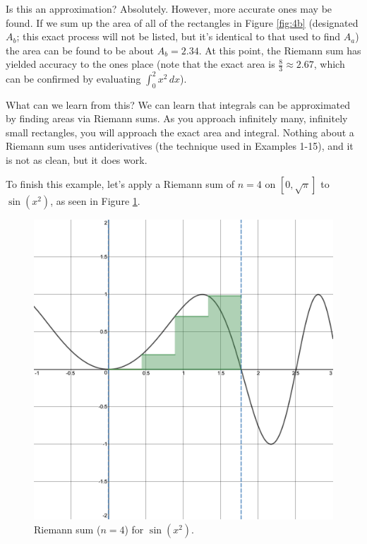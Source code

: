 \documentclass{article}
\newcounter{example}%
\begin{document}
Is this an approximation? Absolutely. However, more accurate ones may be found. If we sum up the area of all of the rectangles in Figure \ref{fig:4b} (designated $A_b$; this exact process will not be listed, but it's identical to that used to find $A_a$) the area can be found to be about $A_b=2.34$. At this point, the Riemann sum has yielded accuracy to the ones place (note that the exact area is $\frac{8}{3}\approx 2.67$, which can be confirmed by evaluating $\int_0^2 x^2\, dx$).\par
What can we learn from this? We can learn that integrals can be approximated by finding areas via Riemann sums. As you approach infinitely many, infinitely small rectangles, you will approach the exact area and integral. Nothing about a Riemann sum uses antiderivatives (the technique used in Examples 1-15), and it is not as clean, but it does work.\par
To finish this example, let's apply a Riemann sum of $n=4$ on $\left[0,\sqrt{\pi}\right]$ to $\sin(x^2)$, as seen in Figure \ref{fig:5}.\par

\begin{figure}[h!]
    \centering
    \includegraphics[width=0.4\linewidth]{Blender/Rsum4-sin.png}
    \caption{Riemann sum ($n=4$) for $\sin(x^2)$.}
    \label{fig:5}
\end{figure}
\end{document}
